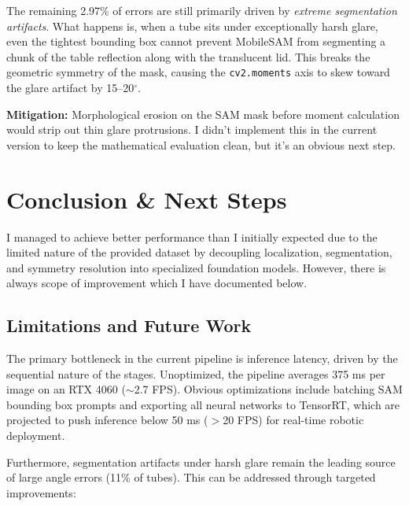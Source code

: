 \documentclass[11pt,a4paper]{article}
\begin{document}
The remaining 2.97\% of errors are still primarily driven by \textit{extreme segmentation artifacts}. What happens is, when a tube sits under exceptionally harsh glare, even the tightest bounding box cannot prevent MobileSAM from segmenting a chunk of the table reflection along with the translucent lid. This breaks the geometric symmetry of the mask, causing the \texttt{cv2.moments} axis to skew toward the glare artifact by 15--20$^\circ$. 

\textbf{Mitigation:} Morphological erosion on the SAM mask before moment calculation would strip out thin glare protrusions. I didn't implement this in the current version to keep the mathematical evaluation clean, but it's an obvious next step.

   \section{Conclusion \& Next Steps}

 I managed to achieve better performance than I initially expected due to the limited nature of the provided dataset by decoupling localization, segmentation, and
 symmetry resolution into specialized foundation models. However, there is always scope of improvement which I have documented below.
   \subsection{Limitations and Future Work}

   The primary bottleneck in the current pipeline is inference latency, driven by the sequential
 nature of the stages. Unoptimized, the pipeline averages 375 ms per image on an RTX 4060
 ($\sim$2.7 FPS). Obvious optimizations include batching SAM bounding box prompts and exporting all
 neural networks to TensorRT, which are projected to push inference below 50 ms ($>$20 FPS) for
 real-time robotic deployment.

   Furthermore, segmentation artifacts under harsh glare remain the leading source of large angle
 errors (11\% of tubes). This can be addressed through targeted improvements:
\end{document}
